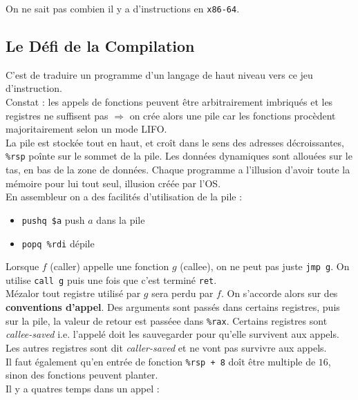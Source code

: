 \documentclass{cours}
\begin{document}
On ne sait pas combien il y a d'instructions en \texttt{x86-64}.

\subsection{Le Défi de la Compilation}
C'est de traduire un programme d'un langage de haut niveau vers ce jeu d'instruction.\\
Constat : les appels de fonctions peuvent être arbitrairement imbriqués et les registres ne suffisent pas $\Rightarrow$ on crée alors une pile car les fonctions procèdent majoritairement selon un mode LIFO.\\
La pile est stockée tout en haut, et croît dans le sens des adresses décroissantes, \texttt{\%rsp} poînte sur le sommet de la pile. Les données dynamiques sont allouées sur le tas, en bas de la zone de données. Chaque programme a l'illusion d'avoir toute la mémoire pour lui tout seul, illusion créée par l'OS. \\
En assembleur on a des facilités d'utilisation de la pile :
\begin{itemize}
    \item \texttt{pushq \$a} push $a$ dans la pile
    \item \texttt{popq \%rdi} dépile
\end{itemize}
Lorsque $f$ (caller) appelle une fonction $g$ (callee), on ne peut pas juste \texttt{jmp g}. On utilise \texttt{call g} puis une fois que c'est terminé \texttt{ret}.\\
Mézalor tout registre utilisé par $g$ sera perdu par $f$. On s'accorde alors sur des \textbf{conventions d'appel}. Des arguments sont passés dans certains registres, puis sur la pile, la valeur de retour est passéee dans \texttt{\%rax}.
Certains registres sont \textit{callee-saved} i.e. l'appelé doit les sauvegarder pour qu'elle survivent aux appels. Les autres registres sont dit \textit{caller-saved} et ne vont pas survivre aux appels. \\
Il faut également qu'en entrée de fonction \texttt{\%rsp + 8} doît être multiple de $16$, sinon des fonctions peuvent planter. \\
Il y a quatres temps dans un appel :
\end{document}
